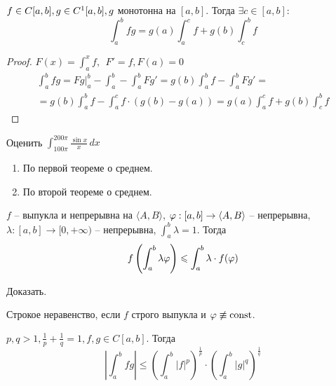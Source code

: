 \begin{Thm} 
	$f \in C[a,b], \\ g \in C^1[a,b], g$ монотонна на $[a,b].$ Тогда $\exists c \in [a,b]:$
	\[\int_{a}^{b} fg = g(a) \int_{a}^{c} f + g(b) \int_{c}^{b} f\]
\end{Thm} 

\begin{proof}
	$\displaystyle F(x) = \int_{a}^{x} f, \ \ F' = f, F(a) = 0$
	\begin{gather*}
		\int_{a}^{b} fg = Fg \Big|^b_a - \int_{a}^{b} - \int_{a}^{b} Fg' = g(b) \int_{a}^{b} f - \int_{a}^{b} Fg' = \\
		= g(b) \int_{a}^{b} f - \int_{a}^{c} f \cdot (g(b) - g(a)) = g(a) \int_{a}^{c} f + g(b) \int_{c}^{b} f
	\end{gather*}
\end{proof}

\begin{Ex}
	Оценить $\int_{100\pi}^{200\pi} \frac{\sin x}{x} \,dx$\\
	\begin{enumerate}
		\item По первой теореме о среднем.
		\item По второй теореме о среднем.
	\end{enumerate}
	
\end{Ex}


\def\AuthorName{Илья Дудников}

\begin{Thm}
	$f$ -- выпукла и непрерывна на $\langle A, B\rangle$, $\varphi : [a, b] \to \langle A, B\rangle$ -- непрерывна,
	$\lambda : [a, b] \to [0, +\infty)$ -- непрерывна, $\int_a^b \lambda = 1$. Тогда
	\[f\left( \int_a^b \lambda \varphi\right) \leqslant \int_a^b \lambda \cdot f(\varphi)\]
\end{Thm}

\begin{Ex}
	Доказать.
\end{Ex}

\begin{Rem}
	Строкое неравенство, если $f$ строго выпукла и $\varphi \not\equiv \operatorname{const}$. 
\end{Rem}

\begin{Thm}
	$p, q > 1, \frac{1}{p} + \frac{1}{q} = 1, f, g \in C[a, b]$. Тогда
	\[\left|\int_a^b fg\right| \leqslant \left(\int_a^b |f|^p\right)^{\frac{1}{p}} \cdot \left(\int_a^b |g|^q\right)^{\frac{1}{q}}\]
\end{Thm}

